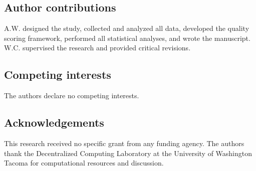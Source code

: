 \documentclass[sn-nature,Numbered]{sn-jnl}
\begin{document}
\subsection*{Author contributions}

A.W. designed the study, collected and analyzed all data, developed the quality scoring framework, performed all statistical analyses, and wrote the manuscript. W.C. supervised the research and provided critical revisions.

\subsection*{Competing interests}

The authors declare no competing interests.

\subsection*{Acknowledgements}

This research received no specific grant from any funding agency. The authors thank the Decentralized Computing Laboratory at the University of Washington Tacoma for computational resources and discussion.
\end{document}

